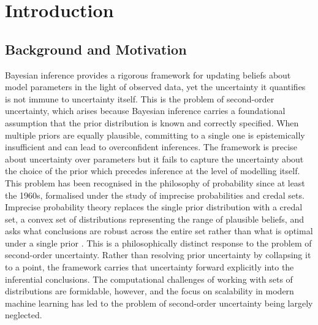 \chapter{Introduction}
\label{cha:intro}

\section{Background and Motivation}
Bayesian inference provides a rigorous framework for updating beliefs 
about model parameters in the light of observed data, yet the uncertainty 
it quantifies is not immune to uncertainty itself. This is the problem of 
second-order uncertainty, which arises because Bayesian inference carries a 
foundational assumption that the prior distribution is known and correctly 
specified. When multiple priors are equally plausible, committing to a single 
one is epistemically insufficient and can lead to overconfident inferences. 
The framework is precise about uncertainty over parameters but it fails to 
capture the uncertainty about the choice of the prior which precedes inference 
at the level of modelling itself. This problem has been recognised in the 
philosophy of probability since at least the 1960s, formalised under the 
study of imprecise probabilities and credal sets. Imprecise probability theory 
replaces the single prior distribution with a credal set, a convex set of 
distributions representing the range of plausible beliefs, and asks what 
conclusions are robust across the entire set rather than what is optimal 
under a single prior \citep{walley1991}\citep{wheeler2022}. This is a philosophically 
distinct response to the problem of second-order uncertainty. Rather than 
resolving prior uncertainty by collapsing it to a point, the framework carries 
that uncertainty forward explicitly into the inferential conclusions. The 
computational challenges of working with sets of distributions are formidable, 
however, and the focus on scalability in modern machine learning has led to 
the problem of second-order uncertainty being largely neglected.

